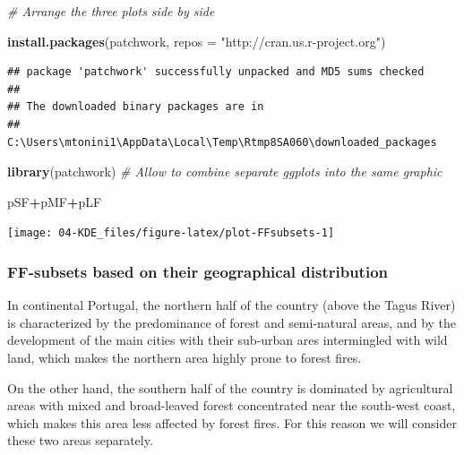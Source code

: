 \documentclass[
]{article}
\newenvironment{Shaded}{\begin{snugshade}}{\end{snugshade}}
\newcommand{\AttributeTok}[1]{\textcolor[rgb]{0.13,0.29,0.53}{#1}}
\newcommand{\CommentTok}[1]{\textcolor[rgb]{0.56,0.35,0.01}{\textit{#1}}}
\newcommand{\FunctionTok}[1]{\textcolor[rgb]{0.13,0.29,0.53}{\textbf{#1}}}
\newcommand{\NormalTok}[1]{#1}
\newcommand{\SpecialCharTok}[1]{\textcolor[rgb]{0.81,0.36,0.00}{\textbf{#1}}}
\newcommand{\StringTok}[1]{\textcolor[rgb]{0.31,0.60,0.02}{#1}}
\begin{document}
\begin{Shaded}
\begin{Highlighting}[]
\CommentTok{\# Arrange the three plots side by side}

\FunctionTok{install.packages}\NormalTok{(}\StringTok{\textquotesingle{}patchwork\textquotesingle{}}\NormalTok{, }\AttributeTok{repos =} \StringTok{"http://cran.us.r{-}project.org"}\NormalTok{) }
\end{Highlighting}
\end{Shaded}

\begin{verbatim}
## package 'patchwork' successfully unpacked and MD5 sums checked
## 
## The downloaded binary packages are in
##  C:\Users\mtonini1\AppData\Local\Temp\Rtmp8SA060\downloaded_packages
\end{verbatim}

\begin{Shaded}
\begin{Highlighting}[]
\FunctionTok{library}\NormalTok{(patchwork) }\CommentTok{\# Allow to  combine separate ggplots into the same graphic}

\NormalTok{pSF}\SpecialCharTok{+}\NormalTok{pMF}\SpecialCharTok{+}\NormalTok{pLF}
\end{Highlighting}
\end{Shaded}

\begin{center}\texttt{[image: 04-KDE\_files/figure-latex/plot-FFsubsets-1]} \end{center}

\subsubsection{FF-subsets based on their geographical distribution}\label{ff-subsets-based-on-their-geographical-distribution}

In continental Portugal, the northern half of the country (above the Tagus River) is characterized by the predominance of forest and semi-natural areas, and by the development of the main cities with their sub-urban ares intermingled with wild land, which makes the northern area highly prone to forest fires.

On the other hand, the southern half of the country is dominated by agricultural areas with mixed and broad-leaved forest concentrated near the south-west coast, which makes this area less affected by forest fires.
For this reason we will consider these two areas separately.
\end{document}
